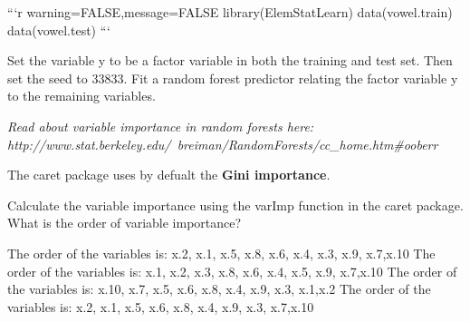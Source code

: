 ```{r warning=FALSE,message=FALSE}
library(ElemStatLearn)
data(vowel.train)
data(vowel.test) 
```

Set the variable y to be a factor variable in both the training and test set. Then set the seed to 33833. Fit a random forest predictor relating the factor variable y to the remaining variables. 

\textit{Read about variable importance in random forests here: http://www.stat.berkeley.edu/~breiman/RandomForests/cc\_home.htm\#ooberr} 

The caret package uses by defualt the \textbf{Gini importance}. 

Calculate the variable importance using the varImp function in the caret package. What is the order of variable importance?

The order of the variables is:
x.2, x.1, x.5, x.8, x.6, x.4, x.3, x.9, x.7,x.10
 The order of the variables is:
x.1, x.2, x.3, x.8, x.6, x.4, x.5, x.9, x.7,x.10
 The order of the variables is:
x.10, x.7, x.5, x.6, x.8, x.4, x.9, x.3, x.1,x.2
 The order of the variables is:
x.2, x.1, x.5, x.6, x.8, x.4, x.9, x.3, x.7,x.10
